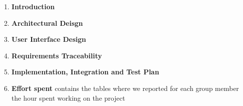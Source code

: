 \begin{enumerate}
  \item \textbf{Introduction}

  \item \textbf{Architectural Deisgn}

  \item \textbf{User Interface Design}

  \item \textbf{Requirements Traceability}

  \item \textbf{Implementation, Integration and Test Plan}

  \item \textbf{Effort spent} contains the tables where we reported for each group member the hour spent working on the project
\end{enumerate}
